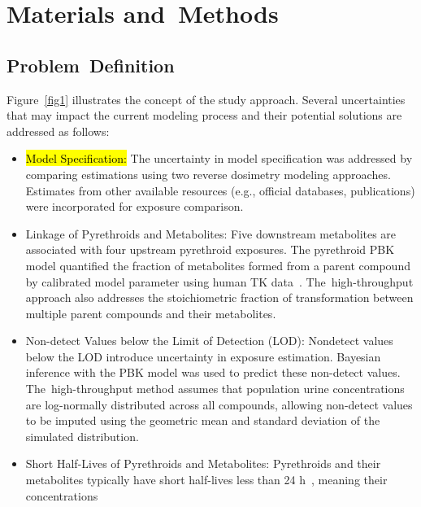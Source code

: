 \documentclass[toxics,article,accept,pdftex,moreauthors]{Definitions/mdpi}
\begin{document}

\section{Materials and~Methods}\label{materials-and-methods}
\unskip

\subsection{Problem~Definition}\label{problem-definition}

Figure~\ref{fig1} illustrates the concept of the study approach. Several
uncertainties that may impact the current modeling process and their potential solutions
are addressed as follows:

\begin{itemize}
\item
  \hl{Model Specification:} %
  The uncertainty in model specification
  was addressed by comparing estimations using two reverse dosimetry
  modeling approaches. Estimates from other available resources (e.g.,
  official databases, publications) were incorporated for exposure
  comparison.
\item
  Linkage of Pyrethroids and Metabolites: Five downstream
  metabolites are associated with four upstream pyrethroid exposures.
  The pyrethroid PBK model quantified the fraction of metabolites formed
  from a parent compound by calibrated model parameter using human TK
  data~\citep{quindroit2019estimating}. The~high-throughput approach
  also addresses the stoichiometric fraction of transformation between
  multiple parent compounds and their metabolites.
\item
  Non-detect Values below the Limit of Detection (LOD):
  Nondetect values below the LOD introduce uncertainty in exposure
  estimation. Bayesian inference with the PBK model was used to predict
  these non-detect values. The~high-throughput method assumes that
  population urine concentrations are log-normally distributed across
  all compounds, allowing non-detect values to be imputed using the
  geometric mean and standard deviation of the simulated distribution.
\item
  Short Half-Lives of Pyrethroids and Metabolites: Pyrethroids
  and their metabolites typically have short half-lives less than 24
  h~\citep{hays2007biomonitoring}, meaning their concentrations

\end{itemize}
\end{document}

